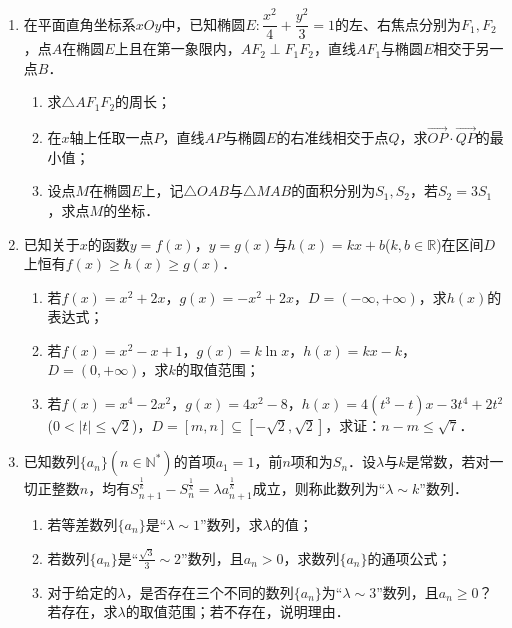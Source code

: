 \begin{description}
\begin{enumerate}[leftmargin=5pt]
        \item 在平面直角坐标系$xOy$中，已知椭圆$E:\dfrac{x^2}{4}+\dfrac{y^2}{3}=1$的左、右焦点分别为$F_1,F_2$，点$A$在椭圆$E$上且在第一象限内，$AF_2\perp F_1F_2$，直线$AF_1$与椭圆$E$相交于另一点$B$．
        \begin{enumerate}[label=(\arabic*)]
            \item 求$\triangle AF_1F_2$的周长；
            \item 在$x$轴上任取一点$P$，直线$AP$与椭圆$E$的右准线相交于点$Q$，求$\overrightarrow{OP}\cdot\overrightarrow{QP}$的最小值；
            \item 设点$M$在椭圆$E$上，记$\triangle OAB$与$\triangle MAB$的面积分别为$S_1,S_2$，若$S_2=3S_1$，求点$M$的坐标．
        \end{enumerate}

        \item 已知关于$x$的函数$y=f(x)$，$y=g(x)$与$h(x)=kx+b$($k,b\in\mathbb{R}$)在区间$D$上恒有$f(x)\geqslant h(x)\geqslant g(x)$．
        \begin{enumerate}[label=(\arabic*)]
            \item 若$f(x)=x^2+2x$，$g(x)=-x^2+2x$，$D=(-\infty,+\infty)$，求$h(x)$的表达式；
            \item 若$f(x)=x^2-x+1$，$g(x)=k\ln x$，$h(x)=kx-k$，$D=(0,+\infty)$，求$k$的取值范围；
            \item 若$f(x)=x^4-2x^2$，$g(x)=4x^2-8$，$h(x)=4(t^3-t)x-3t^4+2t^2$($0<|t|\leqslant\sqrt{2}$)，$D=[m,n]\subseteq[-\sqrt{2},\sqrt{2}]$，求证：$n-m\leqslant\sqrt{7}$．
        \end{enumerate}

        \item 已知数列$\{a_n\}(n\in\mathbb{N}^*)$的首项$a_1=1$，前$n$项和为$S_n$．设$\lambda$与$k$是常数，若对一切正整数$n$，均有$S_{n+1}^{\frac{1}{k}}-S_n^{\frac{1}{k}}=\lambda a_{n+1}^{\frac{1}{k}}$成立，则称此数列为``$\lambda\sim k$''数列．
        \begin{enumerate}[label=(\arabic*)]
            \item 若等差数列$\{a_n\}$是``$\lambda\sim 1$''数列，求$\lambda$的值；
            \item 若数列$\{a_n\}$是``$\frac{\sqrt{3}}{3}\sim 2$''数列，且$a_n>0$，求数列$\{a_n\}$的通项公式；
            \item 对于给定的$\lambda$，是否存在三个不同的数列$\{a_n\}$为``$\lambda\sim 3$''数列，且$a_n\geqslant 0$？若存在，求$\lambda$的取值范围；若不存在，说明理由．
        \end{enumerate}
    \end{enumerate}


\end{description}
